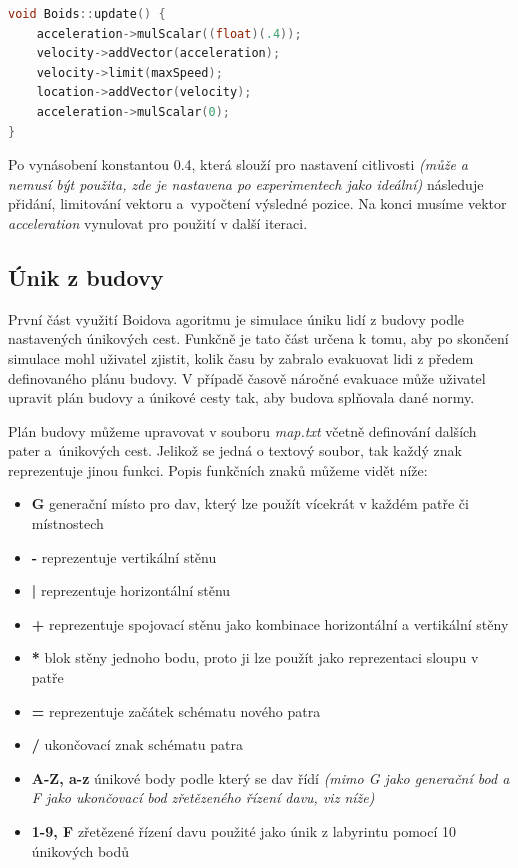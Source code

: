 \documentclass[czech,public,dept460,male,cpdeclaration]{diploma}
\begin{document}
\begin{lstlisting}[language=c++,label=src:seek,caption=Nastavení výsledné pozice agenta] 
void Boids::update() {
	acceleration->mulScalar((float)(.4));
	velocity->addVector(acceleration);
	velocity->limit(maxSpeed);
	location->addVector(velocity);
	acceleration->mulScalar(0);
}
\end{lstlisting}

Po vynásobení konstantou 0.4, která slouží pro nastavení citlivosti \textit{(může a nemusí být použita, zde je nastavena po experimentech jako ideální)} následuje přidání, limitování vektoru a~vypočtení výsledné pozice. Na konci musíme vektor \textit{acceleration} vynulovat pro použití v další iteraci.

\subsection{Únik z budovy}
První část využití Boidova agoritmu je simulace úniku lidí z budovy podle nastavených únikových cest. Funkčně je tato část určena k tomu, aby po skončení simulace mohl uživatel zjistit, kolik času by zabralo evakuovat lidi z předem definovaného plánu budovy. V případě časově náročné evakuace může uživatel upravit plán budovy a únikové cesty tak, aby budova splňovala dané normy.

Plán budovy můžeme upravovat v souboru \textit{map.txt} včetně definování dalších pater a~únikových cest. Jelikož se jedná o textový soubor, tak každý znak reprezentuje jinou funkci. Popis funkčních znaků můžeme vidět níže:

\begin{itemize}
	\item \textbf{G} generační místo pro dav, který lze použít vícekrát v každém patře či místnostech
	\item \textbf{-} reprezentuje vertikální stěnu
	\item \textbf{|} reprezentuje horizontální stěnu
	\item \textbf{+} reprezentuje spojovací stěnu jako kombinace horizontální a vertikální stěny
	\item \textbf{*} blok stěny jednoho bodu, proto ji lze použít jako reprezentaci sloupu v patře
	\item \textbf{=} reprezentuje začátek schématu nového patra
	\item \textbf{/} ukončovací znak schématu patra
	\item \textbf{A-Z, a-z} únikové body podle který se dav řídí \textit{(mimo G jako generační bod a F jako ukončovací bod zřetězeného řízení davu, viz níže)}
	\item \textbf{1-9, F} zřetězené řízení davu použité jako únik z labyrintu pomocí 10 únikových bodů
\end{itemize}
\end{document}
